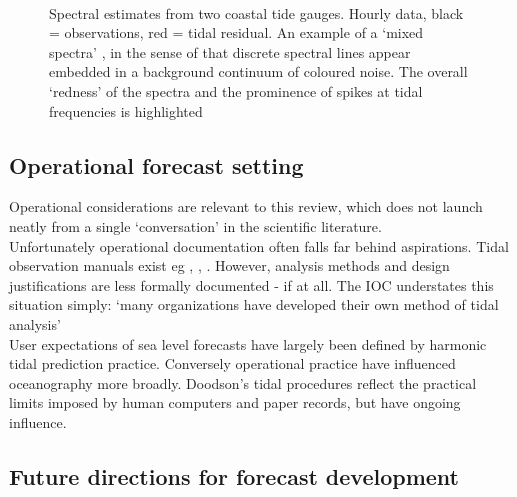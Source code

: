 \begin{figure}[h]\centering
	 \\
	\caption{Spectral estimates from two coastal tide gauges. Hourly data, black = observations, red = tidal residual. An example of a `mixed spectra' \citep{Percival:1998tw}, in the sense of that discrete spectral lines appear embedded in a background continuum of coloured noise.  The overall `redness' of the spectra and the prominence of spikes at tidal frequencies is highlighted }
    \label{fig:SPECTRA_EG}
\end{figure}


\subsection{Operational forecast setting}
\label{S:operational_setting}

Operational considerations are relevant to this review, which does not launch neatly from a single `conversation' \citep{Booth:2009vy} in the scientific literature.\\
Unfortunately operational documentation often falls far behind aspirations.
Tidal observation manuals exist eg \citep{IOC:2005tj}, \citep{Level:2011wu}, \citep{Parker:2007wq}.  However, analysis methods and design justifications are less formally documented - if at all.  The IOC understates this situation simply: `many organizations have developed their own method of tidal analysis'\citep{IOC:2005tj}\\

User expectations of sea level forecasts have largely been defined by harmonic tidal prediction practice. 
Conversely operational practice have influenced oceanography more broadly. Doodson's \citep{Doodson:1928wf} tidal procedures reflect the practical limits imposed by human computers and paper records, but have ongoing influence. \\


\subsection{Future directions for forecast development}

